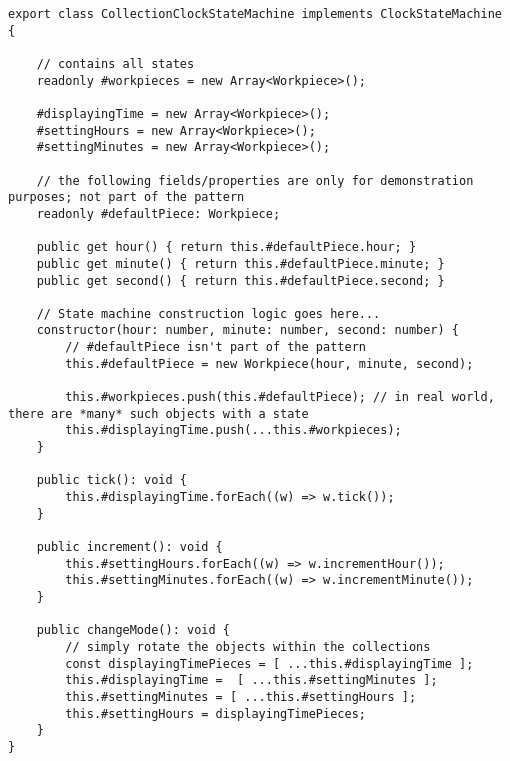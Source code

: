 \begin{lstlisting}[basicstyle=\tiny, style=JavaScript]
export class CollectionClockStateMachine implements ClockStateMachine {

	// contains all states
	readonly #workpieces = new Array<Workpiece>();

	#displayingTime = new Array<Workpiece>();
	#settingHours = new Array<Workpiece>();
	#settingMinutes = new Array<Workpiece>();

	// the following fields/properties are only for demonstration purposes; not part of the pattern
	readonly #defaultPiece: Workpiece;

	public get hour() { return this.#defaultPiece.hour; }
	public get minute() { return this.#defaultPiece.minute; }
	public get second() { return this.#defaultPiece.second; }

	// State machine construction logic goes here...
	constructor(hour: number, minute: number, second: number) {
		// #defaultPiece isn't part of the pattern
		this.#defaultPiece = new Workpiece(hour, minute, second);

		this.#workpieces.push(this.#defaultPiece); // in real world, there are *many* such objects with a state
		this.#displayingTime.push(...this.#workpieces);
	}

	public tick(): void {
		this.#displayingTime.forEach((w) => w.tick());
	}

	public increment(): void {
		this.#settingHours.forEach((w) => w.incrementHour());
		this.#settingMinutes.forEach((w) => w.incrementMinute());
	}

	public changeMode(): void {
		// simply rotate the objects within the collections
		const displayingTimePieces = [ ...this.#displayingTime ];
		this.#displayingTime =  [ ...this.#settingMinutes ];
		this.#settingMinutes = [ ...this.#settingHours ];
		this.#settingHours = displayingTimePieces;
	}
}
\end{lstlisting}
